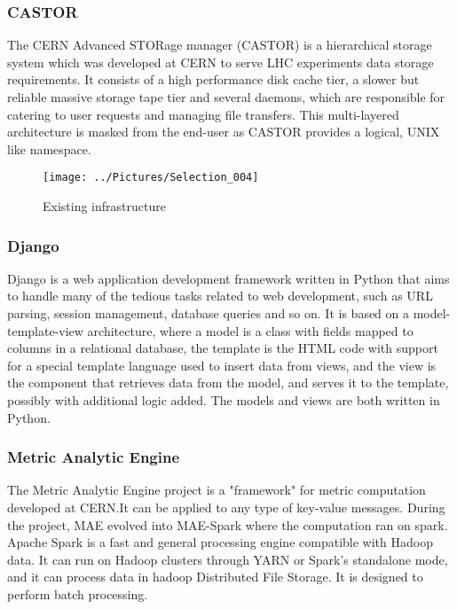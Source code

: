 \documentclass[11pt, letterpaper]{article}            %
\begin{document}
\subsubsection{CASTOR}
The CERN Advanced STORage manager (CASTOR) is a hierarchical storage system which was developed at CERN to serve LHC experiments data storage requirements. It consists of a high performance disk cache tier, a slower but reliable massive storage tape tier and several daemons, which are responsible for catering to user requests and managing file transfers. This multi-layered architecture is masked from the end-user as CASTOR provides a logical, UNIX like namespace.\citep{castor}

\begin{figure}[h]

	\centering
	\texttt{[image: ../Pictures/Selection\_004]}
		\caption{Existing infrastructure}
\end{figure}
\subsubsection{Django}
Django is a web application development framework written in Python that aims to handle many of the tedious tasks related to web development, such as URL parsing, session management, database queries and so on. It is based on a model-template-view architecture, where a model is a class with fields mapped to columns in a relational database, the template is the HTML code with support for a special template language used to insert data from views, and the view is the component that retrieves data from the model, and serves it to the template, possibly with additional logic added. The models and views are both written in Python.\citep{django}
\subsubsection{Metric Analytic Engine}
The Metric Analytic Engine project is a "framework" for metric computation developed at CERN.It can be applied to any type of key-value messages.\citep{MAE}
\smallskip
During the project, MAE evolved into MAE-Spark where the computation ran on spark. Apache Spark is a fast and general processing engine compatible with Hadoop data. It can run on Hadoop clusters through YARN or Spark's standalone mode, and it can process data in hadoop Distributed File Storage. It is designed to perform batch processing. 
\end{document}
